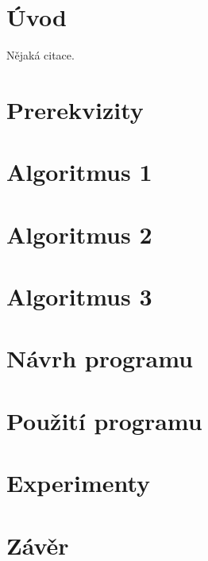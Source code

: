 
\chapter{Úvod}
    \lipsum[2-4]

    Nějaká citace\cite{appleby}.

\chapter{Prerekvizity}
    \lipsum

\chapter{Algoritmus 1}
    \lipsum

\chapter{Algoritmus 2}
    \lipsum

\chapter{Algoritmus 3}
    \lipsum

\chapter{Návrh programu}
    \lipsum

\chapter{Použití programu}
    \lipsum

\chapter{Experimenty}
    \lipsum

\chapter{Závěr}
    \lipsum[2]
